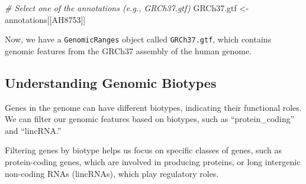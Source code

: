\documentclass[
]{book}
\newenvironment{Shaded}{\begin{snugshade}}{\end{snugshade}}
\newcommand{\CommentTok}[1]{\textcolor[rgb]{0.56,0.35,0.01}{\textit{#1}}}
\newcommand{\FunctionTok}[1]{\textcolor[rgb]{0.13,0.29,0.53}{\textbf{#1}}}
\newcommand{\NormalTok}[1]{#1}
\newcommand{\OtherTok}[1]{\textcolor[rgb]{0.56,0.35,0.01}{#1}}
\newcommand{\SpecialCharTok}[1]{\textcolor[rgb]{0.81,0.36,0.00}{\textbf{#1}}}
\newcommand{\StringTok}[1]{\textcolor[rgb]{0.31,0.60,0.02}{#1}}
\begin{document}
\begin{Shaded}
\begin{Highlighting}[]
\CommentTok{\# Select one of the annotations (e.g., GRCh37.gtf)}
\NormalTok{GRCh37.gtf }\OtherTok{\textless{}{-}}\NormalTok{ annotations[[}\StringTok{\textquotesingle{}AH8753\textquotesingle{}}\NormalTok{]]}
\end{Highlighting}
\end{Shaded}

Now, we have a \texttt{GenomicRanges} object called \texttt{GRCh37.gtf}, which contains genomic features from the GRCh37 assembly of the human genome.

\hypertarget{understanding-genomic-biotypes}{%
\subsection{Understanding Genomic Biotypes}\label{understanding-genomic-biotypes}}

Genes in the genome can have different biotypes, indicating their functional roles. We can filter our genomic features based on biotypes, such as ``protein\_coding'' and ``lincRNA.''

Filtering genes by biotype helps us focus on specific classes of genes, such as protein-coding genes, which are involved in producing proteins, or long intergenic non-coding RNAs (lincRNAs), which play regulatory roles.

\begin{Shaded}
\end{Shaded}
\end{document}
